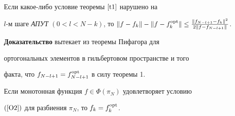 \begin{lem}


Если какое-либо условие теоремы $\ref{t1}$ нарушено на


$l$-м шаге {\em АПУТ} $(0<l<N-k)$, то $\|f-f_k\|-\|f-f_k^{\opt}\|\leq


\frac{\|f_{N-l+1}-f_k\|^2}{2\|f-f_{N-l+1}\|}$.


\end{lem}





{\bf Доказательство} вытекает из теоремы Пифагора для


ортогональных элементов в гильбертовом пространстве и того


факта, что $f_{N-l+1}=f_{N-l+1}^{\operatorname{opt}}$ в силу теоремы 1.





\begin{thm}


Если монотонная функция $f\in\Phi(\pi_N)$ удовлетворяет условию


$(\ref{O2})$ для разбиения $\pi_N$, то  $f_k=f_k^{\operatorname{opt}}$.


\end{thm}





